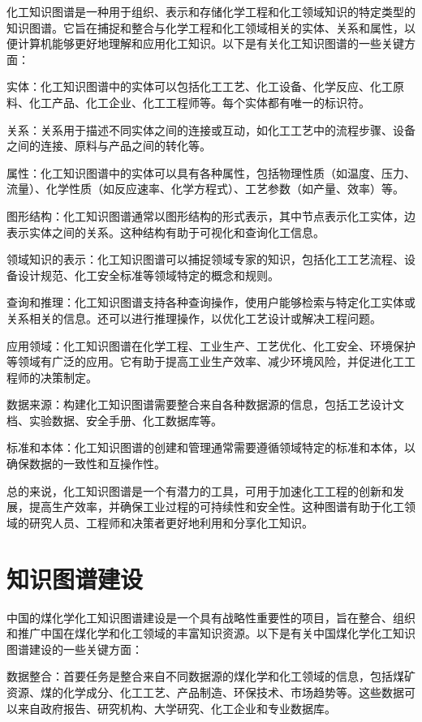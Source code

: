 化工知识图谱是一种用于组织、表示和存储化学工程和化工领域知识的特定类型的知识图谱。它旨在捕捉和整合与化学工程和化工领域相关的实体、关系和属性，以便计算机能够更好地理解和应用化工知识。以下是有关化工知识图谱的一些关键方面：

实体：化工知识图谱中的实体可以包括化工工艺、化工设备、化学反应、化工原料、化工产品、化工企业、化工工程师等。每个实体都有唯一的标识符。

关系：关系用于描述不同实体之间的连接或互动，如化工工艺中的流程步骤、设备之间的连接、原料与产品之间的转化等。

属性：化工知识图谱中的实体可以具有各种属性，包括物理性质（如温度、压力、流量）、化学性质（如反应速率、化学方程式）、工艺参数（如产量、效率）等。

图形结构：化工知识图谱通常以图形结构的形式表示，其中节点表示化工实体，边表示实体之间的关系。这种结构有助于可视化和查询化工信息。

领域知识的表示：化工知识图谱可以捕捉领域专家的知识，包括化工工艺流程、设备设计规范、化工安全标准等领域特定的概念和规则。

查询和推理：化工知识图谱支持各种查询操作，使用户能够检索与特定化工实体或关系相关的信息。还可以进行推理操作，以优化工艺设计或解决工程问题。

应用领域：化工知识图谱在化学工程、工业生产、工艺优化、化工安全、环境保护等领域有广泛的应用。它有助于提高工业生产效率、减少环境风险，并促进化工工程师的决策制定。

数据来源：构建化工知识图谱需要整合来自各种数据源的信息，包括工艺设计文档、实验数据、安全手册、化工数据库等。

标准和本体：化工知识图谱的创建和管理通常需要遵循领域特定的标准和本体，以确保数据的一致性和互操作性。

总的来说，化工知识图谱是一个有潜力的工具，可用于加速化工工程的创新和发展，提高生产效率，并确保工业过程的可持续性和安全性。这种图谱有助于化工领域的研究人员、工程师和决策者更好地利用和分享化工知识。

\section{知识图谱建设}

中国的煤化学化工知识图谱建设是一个具有战略性重要性的项目，旨在整合、组织和推广中国在煤化学和化工领域的丰富知识资源。以下是有关中国煤化学化工知识图谱建设的一些关键方面：

数据整合：首要任务是整合来自不同数据源的煤化学和化工领域的信息，包括煤矿资源、煤的化学成分、化工工艺、产品制造、环保技术、市场趋势等。这些数据可以来自政府报告、研究机构、大学研究、化工企业和专业数据库。

